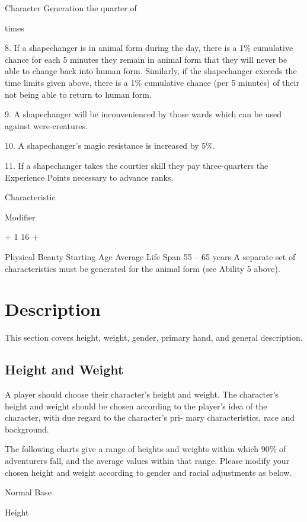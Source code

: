 \begin{Chapter}{Character Generation}
the  quarter  of 

times 

8.  If  a  shapechanger  is  in  animal  form  during  the 
day,  there  is  a  1\%  cumulative  chance  for  each  5 
minutes  they  remain  in  animal  form that  they  will 
never  be  able  to  change  back  into  human  form. 
Similarly,  if  the  shapechanger  exceeds  the  time 
limits  given  above,  there  is  a  1\%  cumulative 
chance  (per  5  minutes)  of  their  not  being  able  to 
return to human form. 

9. A shapechanger will be inconvenienced by those 
wards which can be used against were-creatures. 

10. A shapechanger’s magic resistance is increased 
by 5\%. 

11.  If  a  shapechanger  takes  the  courtier  skill  they 
pay three-quarters the Experience Points necessary 
to advance ranks. 

Characteristic  

Modifier 

+ 1 
16 +  

Physical Beauty  
Starting Age  
Average Life Span   55 – 65 years 
A separate set of characteristics must be generated 
for the animal form (see Ability 5 above). 

\section{Description}

This section covers height, weight, gender, primary hand, and general
description.

\subsection{Height and Weight}

A player should choose their character’s height and weight.  The
character’s height and weight should be chosen according to the
player’s idea of the character, with due regard to the character’s
pri- mary characteristics, race and background.

The following charts give a range of heights and weights within which
90\% of adventurers fall, and the average values within that range.
Please modify your chosen height and weight according to gender and
racial adjustments as below.

Normal Base  

Height  


\end{Chapter}
